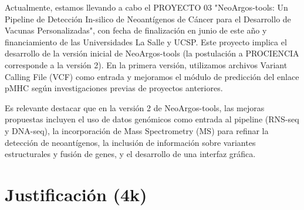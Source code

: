 \documentclass[a4paper,11pt]{article}
\begin{document}
Actualmente, estamos llevando a cabo el PROYECTO 03 "NeoArgos-tools: Un Pipeline de Detección In-silico de Neoantígenos de Cáncer para el Desarrollo de Vacunas Personalizadas", con fecha de finalización en junio de este año y financiamiento de las Universidades La Salle y UCSP. Este proyecto implica el desarrollo de la versión inicial de NeoArgos-tools (la postulación a PROCIENCIA corresponde a la versión 2). En la primera versión, utilizamos archivos Variant Calling File (VCF) como entrada y mejoramos el módulo de predicción del enlace pMHC según investigaciones previas de proyectos anteriores.

Es relevante destacar que en la versión 2 de NeoArgos-tools, las mejoras propuestas incluyen el uso de datos genómicos como entrada al pipeline (RNS-seq y DNA-seq), la incorporación de Mass Spectrometry (MS) para refinar la detección de neoantígenos, la inclusión de información sobre variantes estructurales y fusión de genes, y el desarrollo de una interfaz gráfica.





\section{Justificación (4k)}

\end{document}
